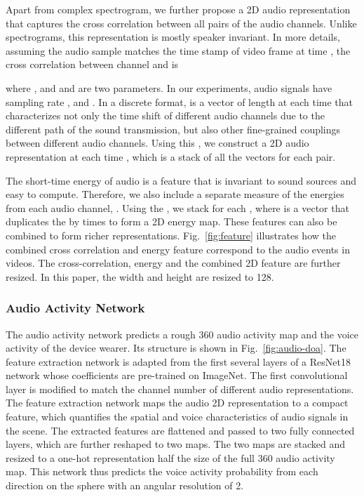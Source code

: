 \documentclass[10pt,twocolumn,letterpaper]{article}
\begin{document}
Apart from complex spectrogram,  
we further propose a 2D audio representation that captures the cross correlation between all pairs of the 
audio channels. 
Unlike spectrograms, this representation is mostly speaker invariant.
In more details, assuming the audio sample  matches the time stamp of video frame at time , the cross
correlation  between channel  and  is
\vspace{-3pt}
\small

\normalsize
where , and  and  are two parameters. 
In our experiments, audio signals have sampling rate ,  and . In a discrete format,  is a vector of length  at each time  
that characterizes not only the time shift of different audio channels due to the different path of the sound
transmission, but also other fine-grained couplings between different audio channels.
Using this , we construct a 2D audio representation at each time , 
which is a stack of all the vectors  for each  pair.

The short-time energy of audio is a feature that is invariant to sound sources 
and easy to compute.
Therefore, we also include a separate measure of the energies from each audio channel, 
\small . \normalsize
Using the , we stack  for each , where  is 
a vector that duplicates the  by  times to form a 2D energy map.
These features can also be combined to form richer representations. 
Fig.~\ref{fig:feature} illustrates how the combined cross correlation and energy feature correspond to 
the audio events in videos. 
The cross-correlation, energy and the combined 2D feature are further
resized. In this paper, the width and height are resized to 128. 

\vspace{-10pt}
\subsubsection{Audio Activity Network}
\vspace{-5pt}

The audio activity network predicts a rough 360 audio activity map and the voice activity of the device wearer. 
Its structure is shown in Fig.~\ref{fig:audio-doa}.
The feature extraction network is adapted from the first several layers of a ResNet18 network whose coefficients
are pre-trained on ImageNet. The first convolutional layer is modified to match the channel number of 
different audio representations.
The feature extraction network maps the audio 2D representation to a compact feature, which quantifies 
the spatial and voice characteristics of audio signals in the scene.
The extracted features are flattened and passed to two fully connected layers, which are further
reshaped to two  maps. The two maps are stacked and resized to a  one-hot representation
half the size of the full 360 audio activity map. This network thus predicts the voice activity probability 
from each direction on the sphere with an angular resolution of 2. 
\end{document}
